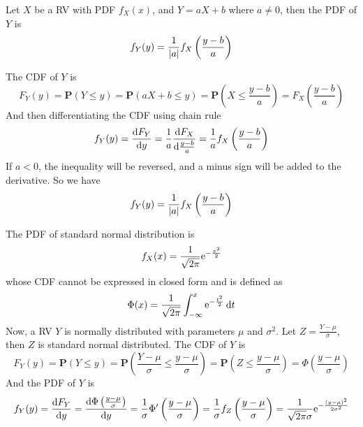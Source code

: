 \documentclass[device=normal, lang=en]{elegantbook}
\numberwithin{equation}{section}
\begin{document}
\begin{example}[PDF of $Y = aX+b$]
    Let $X$ be a RV with PDF $f_{X}(x)$, and $Y = aX + b$ where $a \neq 0$, then the PDF of $Y$ is
    \begin{equation}
        f_{Y}(y) = \frac{1}{\abs{a}} f_{X}\left(\frac{y - b}{a}\right)
    \end{equation}
\end{example}
\begin{solution}
    The CDF of $Y$ is
    \begin{equation}
        F_{Y}(y) = \mathbf{P}(Y \leq y) = \mathbf{P}(aX + b \leq y) = \mathbf{P}\left(X \leq \frac{y - b}{a}\right) = F_{X}\left(\frac{y - b}{a}\right)
    \end{equation}
    And then differentiating the CDF using chain rule
    \begin{equation}
        f_{Y}(y) = \dv{F_{Y}}{y} = \frac{1}{a} \dv{F_{X}}{\frac{y - b}{a}} = \frac{1}{a} f_{X}\left(\frac{y - b}{a}\right)
    \end{equation}
    If $a < 0$, the inequality will be reversed, and a minus sign will be added to the derivative. So we have
    \begin{equation}
        f_{Y}(y) = \frac{1}{\abs{a}} f_{X}\left(\frac{y - b}{a}\right)
    \end{equation}
\end{solution}

\begin{example}
    The PDF of standard normal distribution is
    \begin{equation}
        f_{X}(x) = \frac{1}{\sqrt{2\pi}} \mathrm{e}^{-\frac{x^2}{2}}
    \end{equation}
    whose CDF cannot be expressed in closed form and is defined as
    \begin{equation}
        \Phi(x) = \frac{1}{\sqrt{2\pi}} \int_{-\infty}^{x} \mathrm{e}^{-\frac{t^2}{2}} \dd{t}
    \end{equation}
    Now, a RV $Y$ is normally distributed with parameters $\mu$ and $\sigma^2$. Let $Z = \frac{Y - \mu}{\sigma}$, then $Z$ is standard normal distributed. The CDF of $Y$ is
    \begin{equation}
        F_{Y}(y) = \mathbf{P}(Y \leq y) = \mathbf{P}\left(\frac{Y - \mu}{\sigma} \leq \frac{y - \mu}{\sigma}\right) = \mathbf{P}(Z \leq \frac{y - \mu}{\sigma}) = \Phi\left(\frac{y - \mu}{\sigma}\right)
    \end{equation}
    And the PDF of $Y$ is
    \begin{equation}
        f_{Y}(y) = \dv{F_{Y}}{y} = \dv{\Phi\left(\frac{y - \mu}{\sigma}\right)}{y} = \frac{1}{\sigma} \Phi'\left(\frac{y - \mu}{\sigma}\right) = \frac{1}{\sigma} f_{Z}\left(\frac{y - \mu}{\sigma}\right) = \frac{1}{\sqrt{2\pi}\sigma} \mathrm{e}^{-\frac{(y - \mu)^2}{2\sigma^2}}
    \end{equation}
\end{example}
\end{document}
